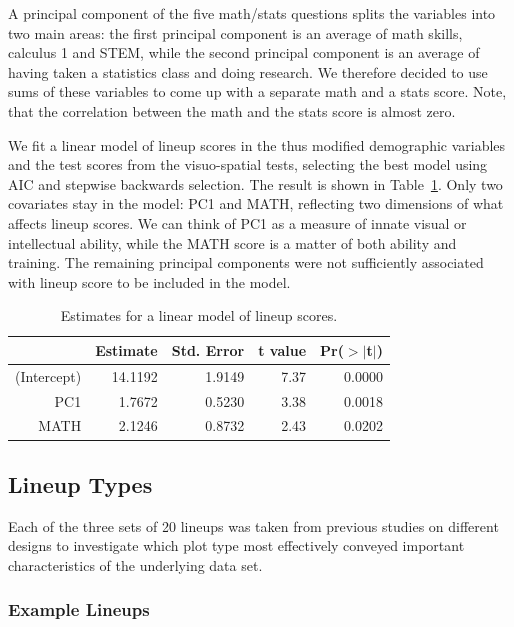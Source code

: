 \documentclass[11pt]{isuthesis}\usepackage[]{graphicx}\usepackage[]{color}
\begin{document}
A principal component of the five math/stats questions splits the variables into two main areas: the first principal component is an average of math skills, calculus 1 and STEM, while the second principal component is an average of having taken a statistics class and doing research. We therefore decided to use sums of these variables to come up with a separate math and a stats score. Note, that the correlation between the math and the stats score is almost zero. 

We fit a linear model of lineup scores in the thus modified demographic variables and the test scores from the visuo-spatial tests, selecting the best model using AIC and stepwise backwards selection. The result is shown in Table~\ref{tab:m1}. Only two covariates stay in the model: PC1 and MATH, reflecting two dimensions of what affects lineup scores. We can think of PC1 as a measure of innate visual or intellectual ability, while the MATH score is a matter of both ability and training. The remaining principal components were not sufficiently associated with lineup score to be included in the model.

\begin{table}[ht]
\centering
\caption[Estimates for a linear model of lineup scores]{Estimates for a linear model of lineup scores.} 
\label{tab:m1}
\begin{tabular}{rrrrr}
  \hline
 & Estimate & Std. Error & t value & Pr($>$$|$t$|$) \\ 
  \hline
(Intercept) & 14.1192 & 1.9149 & 7.37 & 0.0000 \\ 
  PC1 & 1.7672 & 0.5230 & 3.38 & 0.0018 \\ 
  MATH & 2.1246 & 0.8732 & 2.43 & 0.0202 \\ 
   \hline
\end{tabular}
\end{table}

\subsection{Lineup Types}
Each of the three sets of 20 lineups was taken from previous studies on different designs to investigate which plot type most effectively conveyed important characteristics of the underlying data set. 

\subsubsection{Example Lineups}
\end{document}
